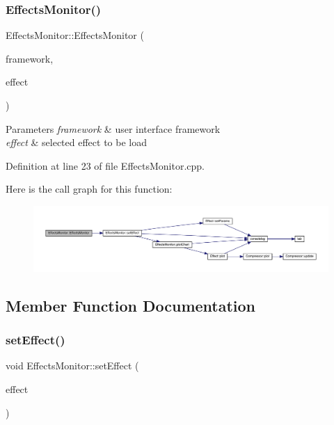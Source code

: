 \subsubsection{\texorpdfstring{Effects\+Monitor()}{EffectsMonitor()}\hspace{0.1cm}{\footnotesize\ttfamily [2/2]}}
{\footnotesize\ttfamily Effects\+Monitor\+::\+Effects\+Monitor (\begin{DoxyParamCaption}\item[{Q\+Widget $\ast$}]{framework,  }\item[{\hyperlink{class_effect}{Effect} $\ast$}]{effect }\end{DoxyParamCaption})}


\begin{DoxyParams}{Parameters}
{\em framework} & user interface framework \\
\hline
{\em effect} & selected effect to be load \\
\hline
\end{DoxyParams}


Definition at line 23 of file Effects\+Monitor.\+cpp.

Here is the call graph for this function\+:
\nopagebreak
\begin{figure}[H]
\begin{center}
\leavevmode
\includegraphics[width=350pt]{class_effects_monitor_ad9215233b6d88585ec5d31ca4f35771a_cgraph}
\end{center}
\end{figure}


\subsection{Member Function Documentation}
\mbox{\label{class_effects_monitor_ade184df36063a2c7ef2855c12265bd78}} 
\subsubsection{\texorpdfstring{set\+Effect()}{setEffect()}}
{\footnotesize\ttfamily void Effects\+Monitor\+::set\+Effect (\begin{DoxyParamCaption}\item[{\hyperlink{class_effect}{Effect} $\ast$}]{effect }\end{DoxyParamCaption})}


